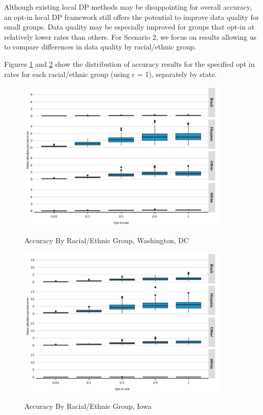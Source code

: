 \documentclass[
]{urban-formatting}
\begin{document}
Although existing local DP methods may be disappointing for overall
accuracy, an opt-in local DP framework still offers the potential to
improve data quality for small groups. Data quality may be especially
improved for groups that opt-in at relatively lower rates than others.
For Scenario 2, we focus on results allowing us to compare differences
in data quality by racial/ethnic group.

Figures \ref{fig:groups_dc} and \ref{fig:groups_ia} show the
distribution of accuracy results for the specified opt in rates for each
racial/ethnic group (using \(\epsilon\) = 1), separately by state.

\begin{figure}[!htb]
    \centering
    \caption{Accuracy By Racial/Ethnic Group, Washington, DC}
    \includegraphics[width=4in]{../figures/groups_dc.png}
    \label{fig:groups_dc}
\end{figure}

\begin{figure}[!htb]
    \centering
    \caption{Accuracy By Racial/Ethnic Group, Iowa}
    \includegraphics[width=4in]{../figures/groups_ia.png}
    \label{fig:groups_ia}
\end{figure}
\end{document}
